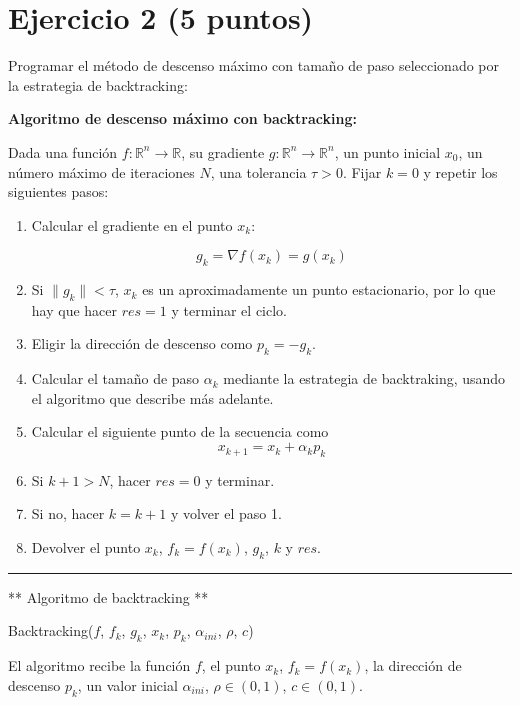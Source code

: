 \documentclass[11pt]{article}
\begin{document}
    \hypertarget{ejercicio-2-5-puntos}{%
\section{Ejercicio 2 (5 puntos)}\label{ejercicio-2-5-puntos}}

Programar el método de descenso máximo con tamaño de paso seleccionado
por la estrategia de backtracking:

\textbf{Algoritmo de descenso máximo con backtracking:}

Dada una función \(f: \mathbb{R}^n \rightarrow \mathbb{R}\), su
gradiente \(g: \mathbb{R}^n \rightarrow \mathbb{R}^n\), un punto inicial
\(x_0\), un número máximo de iteraciones \(N\), una tolerancia
\(\tau>0\). Fijar \(k=0\) y repetir los siguientes pasos:

\begin{enumerate}
\def\labelenumi{\arabic{enumi}.}
\item
  Calcular el gradiente en el punto \(x_k\):

  \[ g_k = \nabla f(x_k) = g(x_k) \]
\item
  Si \(\|g_k\|<\tau\), \(x_k\) es un aproximadamente un punto
  estacionario, por lo que hay que hacer \(res=1\) y terminar el ciclo.
\item
  Eligir la dirección de descenso como \(p_k = - g_k\).
\item
  Calcular el tamaño de paso \(\alpha_k\) mediante la estrategia de
  backtraking, usando el algoritmo que describe más adelante.
\item
  Calcular el siguiente punto de la secuencia como
  \[x_{k+1} = x_k + \alpha_k p_k \]
\item
  Si \({k+1}>N\), hacer \(res=0\) y terminar.
\item
  Si no, hacer \(k = k+1\) y volver el paso 1.
\item
  Devolver el punto \(x_k\), \(f_k= f(x_k)\), \(g_k\), \(k\) y \(res\).
\end{enumerate}

\begin{center}\rule{0.5\linewidth}{0.5pt}\end{center}

** Algoritmo de backtracking **

Backtracking(\(f\), \(f_k\), \(g_k\), \(x_k\), \(p_k\),
\(\alpha_{ini}\), \(\rho\), \(c\))

El algoritmo recibe la función \(f\), el punto \(x_k\),
\(f_k = f(x_k)\), la dirección de descenso \(p_k\), un valor inicial
\(\alpha_{ini}\), \(\rho \in (0,1)\), \(c \in (0,1)\).
\end{document}
